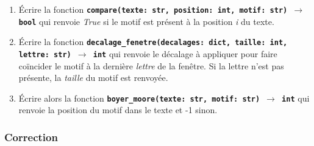 \documentclass[svgnames,11pt]{beamer}
\begin{document}
\begin{frame}
    \frametitle{}

    \begin{activite}
        \begin{enumerate}
            \item Écrire la fonction \textbf{\texttt{compare(texte: str, position: int, motif: str) $\rightarrow$ bool}} qui renvoie \emph{True} si le motif est présent à la position \emph{i} du texte.
            \item Écrire la fonction \textbf{\texttt{decalage\_fenetre(decalages: dict, taille: int, lettre: str) $\rightarrow$ int}} qui renvoie le décalage à appliquer pour faire coïncider le motif à la dernière \emph{lettre} de la fenêtre. Si la lettre n'est pas présente, la \emph{taille} du motif est renvoyée.
            \item Écrire alors la fonction \textbf{\texttt{boyer\_moore(texte: str, motif: str) $\rightarrow$ int}} qui renvoie la position du motif dans le texte et -1 sinon.
        \end{enumerate}
    \end{activite}

\end{frame}
\begin{frame}
    \frametitle{Correction}



\end{frame}
\begin{frame}



\end{frame}
\begin{frame}



\end{frame}
\begin{frame}



\end{frame}
\end{document}
